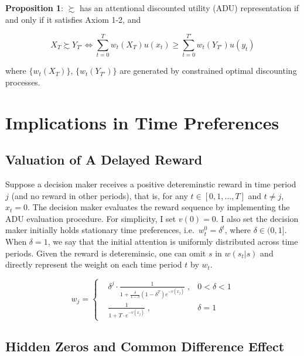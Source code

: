 \documentclass[
  12pt,
]{article}
\begin{document}
\textbf{Proposition 1}: \(\succsim\) has an attentional discounted
utility (ADU) representation if and only if it satisfies Axiom 1-2, and

\[
X_T \succsim Y_{T'} \Longleftrightarrow \sum_{t=0}^T w_t(X_T) u(x_t)\geq \sum_{t=0}^{T'} w_t(Y_{T'}) u(y_t) 
\]

where \(\{w_t(X_T)\}\), \(\{w_t(Y_{T'})\}\) are generated by constrained
optimal discounting processes.

\hypertarget{implications-in-time-preferences}{%
\section{\texorpdfstring{Implications in Time Preferences
\label{behavioral}}{Implications in Time Preferences }}\label{implications-in-time-preferences}}

\hypertarget{valuation-of-a-delayed-reward}{%
\subsection{Valuation of A Delayed
Reward}\label{valuation-of-a-delayed-reward}}

Suppose a decision maker receives a positive detereminstic reward in
time period \(j\) (and no reward in other periods), that is, for any
\(t\in[0,1,…,T]\) and \(t \neq j\), \(x_t = 0\). The decision maker
evaluates the reward sequence by implementing the ADU evaluation
procedure. For simplicity, I set \(v(0)=0\). I also set the decision
maker initially holds stationary time preferences,
i.e.~\(w^0_t=\delta^t\), where \(\delta\in(0,1]\). When \(\delta=1\), we
say that the initial attention is uniformly distributed across time
periods. Given the reward is detereminsic, one can omit \(s\) in
\(w(s_t|s)\) and directly represent the weight on each time period \(t\)
by \(w_t\).

\[ 
w_j = \left\{ \begin{aligned}
& \delta^j \cdot\frac{1}{1+\frac{\delta}{1-\delta}(1-\delta^T)e^{-v(x_j)}}\;, & 0<\delta<1 \\
& \frac{1}{1+T\cdot e^{-v(x_j)}}\; , & \delta=1
\end{aligned}
\right.
\]

\hypertarget{hidden-zeros-and-common-difference-effect}{%
\subsection{Hidden Zeros and Common Difference
Effect}\label{hidden-zeros-and-common-difference-effect}}
\end{document}
